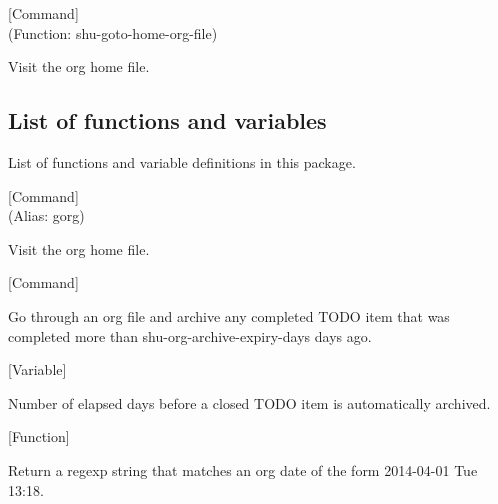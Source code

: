 \vspace{1em}
\noindent
{}
\usebox{\funcname}
 \hfill [Command]\\%
 (Function: shu-goto-home-org-file)

\begin{doc-string}
Visit the org home file.
\end{doc-string}

\subsection{List of functions and variables}

List of functions and variable definitions in this package.



\vspace{1em}
\noindent
{}
\usebox{\funcname}
 \hfill [Command]\\%
 (Alias: gorg)

\begin{doc-string}
Visit the org home file.
\end{doc-string}

\vspace{1em}
\noindent
{}
\usebox{\funcname}
 \hfill [Command]

\begin{doc-string}
Go through an org file and archive any completed TODO item that was completed more
than shu-org-archive-expiry-days days ago.
\end{doc-string}

\vspace{1em}
\noindent
{}
\usebox{\funcname}
 \hfill [Variable]

\begin{doc-string}
Number of elapsed days before a closed TODO item is automatically archived.
\end{doc-string}

\vspace{1em}
\noindent
{}
\usebox{\funcname}
 \hfill [Function]

\begin{doc-string}
Return a regexp string that matches an org date of the form 2014-04-01 Tue 13:18.
\end{doc-string}

